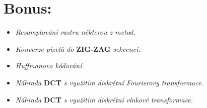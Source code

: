 \section*{Bonus:}

\begin{itemize}
    \item \textit{Resamplování rastru některou z metod.}
    \item \textit{Konverze pixelů do} \textbf{ZIG-ZAG} \textit{sekvencí.}
    \item \textit{Huffmanovo kódování.}
    \item \textit{Náhrada }\textbf{DCT}\textit{ s využitím diskrétní Fourierovy transformace.}
    \item \textit{Náhrada }\textbf{DCT}\textit{ s využitím diskrétní vlnkové transformace.}
\end{itemize}

